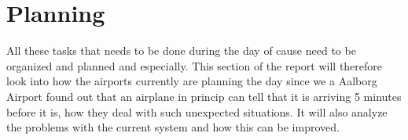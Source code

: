 \chapter{Planning}
All these tasks that needs to be done during the day of cause need to be organized and planned and especially. This section of the report will therefore look into how the airports currently are planning the day since we a Aalborg Airport found out that an airplane in princip can tell that it is arriving 5 minutes before it is, how they deal with such unexpected situations.
It will also analyze the problems with the current system and how this can be improved.
